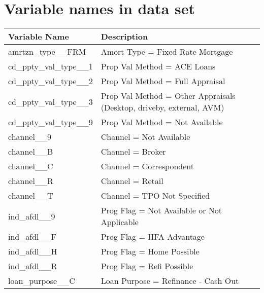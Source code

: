 \appendix
\chapter{Variable names in data set}
\begin{longtable}{lp{8cm}}\toprule
\textbf{Variable Name}             & \textbf{Description}                                                 \\\midrule
\endfirsthead
%
\endhead
%
amrtzn\_type\_\_FRM                & Amort Type = Fixed Rate Mortgage                                     \\\hline
cd\_ppty\_val\_type\_\_1           & Prop Val Method = ACE Loans                                          \\
cd\_ppty\_val\_type\_\_2           & Prop Val Method = Full Appraisal                                     \\
cd\_ppty\_val\_type\_\_3           & Prop Val Method = Other Appraisals (Desktop, driveby, external, AVM) \\
cd\_ppty\_val\_type\_\_9           & Prop Val Method = Not Available                                      \\\hline
channel\_\_9                       & Channel = Not Available                                              \\
channel\_\_B                       & Channel = Broker                                                     \\
channel\_\_C                       & Channel = Correspondent                                              \\
channel\_\_R                       & Channel = Retail                                                     \\
channel\_\_T                       & Channel = TPO Not Specified                                          \\\hline
ind\_afdl\_\_9                     & Prog Flag = Not Available or Not Applicable                          \\
ind\_afdl\_\_F                     & Prog Flag = HFA Advantage                                            \\
ind\_afdl\_\_H                     & Prog Flag = Home Possible                                            \\
ind\_afdl\_\_R                     & Prog Flag = Refi Possible                                            \\\hline
loan\_purpose\_\_C                 & Loan Purpose = Refinance - Cash Out                                  \\

\end{longtable}
